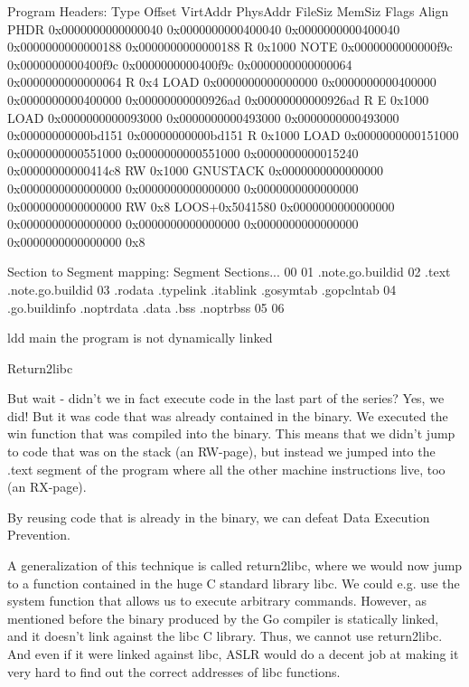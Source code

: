         Program Headers:
        Type           Offset             VirtAddr           PhysAddr
        FileSiz            MemSiz              Flags  Align
        PHDR           0x0000000000000040 0x0000000000400040 0x0000000000400040
        0x0000000000000188 0x0000000000000188  R      0x1000
        NOTE           0x0000000000000f9c 0x0000000000400f9c 0x0000000000400f9c
        0x0000000000000064 0x0000000000000064  R      0x4
        LOAD           0x0000000000000000 0x0000000000400000 0x0000000000400000
        0x00000000000926ad 0x00000000000926ad  R E    0x1000
        LOAD           0x0000000000093000 0x0000000000493000 0x0000000000493000
        0x00000000000bd151 0x00000000000bd151  R      0x1000
        LOAD           0x0000000000151000 0x0000000000551000 0x0000000000551000
        0x0000000000015240 0x00000000000414c8  RW     0x1000
        GNUSTACK      0x0000000000000000 0x0000000000000000 0x0000000000000000
        0x0000000000000000 0x0000000000000000  RW     0x8
        LOOS+0x5041580 0x0000000000000000 0x0000000000000000 0x0000000000000000
        0x0000000000000000 0x0000000000000000         0x8

        Section to Segment mapping:
        Segment Sections...
        00
        01     .note.go.buildid
        02     .text .note.go.buildid
        03     .rodata .typelink .itablink .gosymtab .gopclntab
        04     .go.buildinfo .noptrdata .data .bss .noptrbss
        05
        06

        ldd main
        the program is not dynamically linked



        Return2libc

        But wait - didn't we in fact execute code in the last part of the series? Yes, we did! But it was code that was already
        contained in the binary. We executed the win function that was compiled into the binary. This means that we didn't
        jump to code that was on the stack (an RW-page), but instead we jumped into the .text segment of the program where all
        the other machine instructions live, too (an RX-page).

        By reusing code that is already in the binary, we can defeat Data Execution Prevention.

        A generalization of this technique is called return2libc, where we would now jump to a function contained in the huge
        C standard library libc. We could e.g. use the system function that allows us to execute arbitrary commands. However,
        as mentioned before the binary produced by the Go compiler is statically linked, and it doesn't link against the libc
        C library. Thus, we cannot use return2libc. And even if it were linked against libc, ASLR would do a decent job at
        making it very hard to find out the correct addresses of libc functions.



